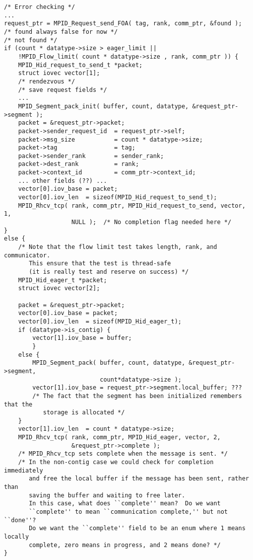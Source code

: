 \begin{verbatim}
/* Error checking */
...
request_ptr = MPID_Request_send_FOA( tag, rank, comm_ptr, &found );
/* found always false for now */
/* not found */
if (count * datatype->size > eager_limit ||
    !MPID_Flow_limit( count * datatype->size , rank, comm_ptr )) {
    MPID_Hid_request_to_send_t *packet;
    struct iovec vector[1];
    /* rendezvous */
    /* save request fields */
    ...
    MPID_Segment_pack_init( buffer, count, datatype, &request_ptr->segment );
    packet = &request_ptr->packet;
    packet->sender_request_id  = request_ptr->self;
    packet->msg_size           = count * datatype->size;
    packet->tag                = tag;
    packet->sender_rank        = sender_rank;
    packet->dest_rank          = rank;
    packet->context_id         = comm_ptr->context_id;
    ... other fields (??) ...
    vector[0].iov_base = packet;
    vector[0].iov_len  = sizeof(MPID_Hid_request_to_send_t);
    MPID_Rhcv_tcp( rank, comm_ptr, MPID_Hid_request_to_send, vector, 1, 
                   NULL );  /* No completion flag needed here */
}
else {
    /* Note that the flow limit test takes length, rank, and communicator.
       This ensure that the test is thread-safe 
       (it is really test and reserve on success) */
    MPID_Hid_eager_t *packet;
    struct iovec vector[2];

    packet = &request_ptr->packet; 
    vector[0].iov_base = packet;
    vector[0].iov_len  = sizeof(MPID_Hid_eager_t);
    if (datatype->is_contig) {
        vector[1].iov_base = buffer;
        }
    else {
        MPID_Segment_pack( buffer, count, datatype, &request_ptr->segment, 
                           count*datatype->size );
        vector[1].iov_base = request_ptr->segment.local_buffer; ???
        /* The fact that the segment has been initialized remembers that the
           storage is allocated */
    }
    vector[1].iov_len  = count * datatype->size;
    MPID_Rhcv_tcp( rank, comm_ptr, MPID_Hid_eager, vector, 2, 
                   &request_ptr->complete );
    /* MPID_Rhcv_tcp sets complete when the message is sent. */
    /* In the non-contig case we could check for completion immediately
       and free the local buffer if the message has been sent, rather than 
       saving the buffer and waiting to free later.
       In this case, what does ``complete'' mean?  Do we want
       ``complete'' to mean ``communication complete,'' but not ``done''? 
       Do we want the ``complete'' field to be an enum where 1 means locally
       complete, zero means in progress, and 2 means done? */
}
\end{verbatim}


